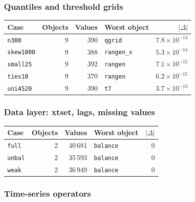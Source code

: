 \subsubsection*{Quantiles and threshold grids}

\begin{longtable}{@{}p{3.6cm}rrp{4.9cm}r@{}}
\toprule
Case & Objects & Values & Worst object & $|\Delta|$ \\
\midrule
\endhead
\texttt{n300} & 9 & 390 & \texttt{qgrid} & $7.8\times10^{-14}$ \\
\texttt{skew1000} & 9 & 388 & \texttt{rangen\_\allowbreak{}x} & $5.3\times10^{-14}$ \\
\texttt{small25} & 9 & 392 & \texttt{rangen} & $7.1\times10^{-15}$ \\
\texttt{ties10} & 9 & 370 & \texttt{rangen} & $6.2\times10^{-15}$ \\
\texttt{uni4520} & 9 & 390 & \texttt{t7} & $3.7\times10^{-13}$ \\
\bottomrule
\end{longtable}

\subsubsection*{Data layer: xtset, lags, missing values}

\begin{longtable}{@{}p{3.6cm}rrp{4.9cm}r@{}}
\toprule
Case & Objects & Values & Worst object & $|\Delta|$ \\
\midrule
\endhead
\texttt{full} & 2 & 40\,681 & \texttt{balance} & 0 \\
\texttt{unbal} & 2 & 35\,593 & \texttt{balance} & 0 \\
\texttt{weak} & 2 & 36\,949 & \texttt{balance} & 0 \\
\bottomrule
\end{longtable}

\subsubsection*{Time-series operators}

